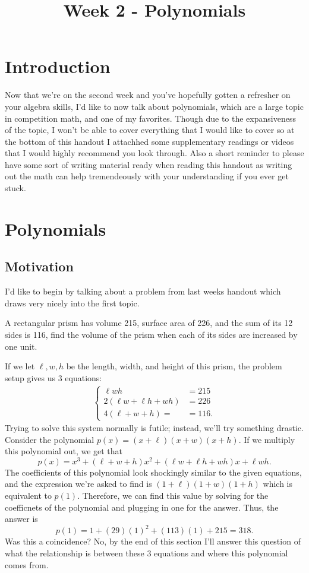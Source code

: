 \documentclass[11pt]{article}
\begin{document}
\title{Week 2 - Polynomials}
\maketitle

\section*{Introduction}
\par Now that we're on the second week and you've hopefully gotten a refresher on your algebra skills, I'd like to now talk about polynomials, which are a large topic in competition math, and one of my favorites. Though due to the expansiveness of the topic, 
I won't be able to cover everything that I would like to cover so at the bottom of this handout I attachhed some supplementary readings or videos that I would highly recommend you look through. Also a short reminder to please have some sort of writing material ready when reading this handout as writing out the math can help tremendeously with your understanding
if you ever get stuck.

\section{Polynomials}
\subsection*{Motivation}
\par I'd like to begin by talking about a problem from last weeks handout which draws very nicely into the first topic.
\begin{example}
    A rectangular prism has volume 215, surface area of 226, and the sum of its 12 sides is 116, find
    the volume of the prism when each of its sides are increased by one unit.
\end{example}
If we let $\ell, w, h$ be the length, width, and height of this prism, the problem setup gives us 3 equations:
\begin{align}
    \begin{cases}
        \ell w h & = 215 \\
        2(\ell w + \ell h + wh) & = 226 \\
        4(\ell + w + h) = & = 116.
    \end{cases}
\end{align}
Trying to solve this system normally is futile; instead, we'll try something drastic. Consider the polynomial $p(x) = (x+\ell)(x+w)(x+h)$. If we multiply this polynomial out, we get that $$p(x)=x^3 + (\ell + w + h)x^2 + (\ell w + \ell h + wh)x + \ell w h.$$ The coefficients
of this polynomial look shockingly similar to the given equations, and the expression we're asked to find is $(1+\ell)(1+w)(1+h)$ which is equivalent to $p(1)$. Therefore, we can find this value by solving for the coefficnets of the polynomial and plugging in one for the answer. Thus, the answer is
\[
p(1) = 1 + (29)(1)^2 + (113)(1) + 215 = 318.
\] Was this a coincidence? No, by the end of this section I'll answer this question of what the relationship is between these 3 equations and where this polynomial comes from. 
\end{document}
